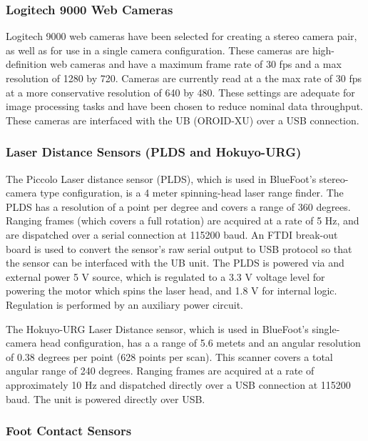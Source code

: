 			\subsubsection{Logitech 9000 Web Cameras}

				Logitech 9000 web cameras have been selected for creating a stereo camera pair, as well as for use in a single camera configuration. These cameras are high-definition web cameras and have a maximum frame rate of 30 fps and a max resolution of 1280 by 720. Cameras are currently read at a the max rate of 30 fps at a more conservative resolution of 640 by 480. These settings are adequate for image processing tasks and have been chosen to reduce nominal data throughput. These cameras are interfaced with the UB (OROID-XU) over a USB connection.

			\subsubsection{Laser Distance Sensors (PLDS and Hokuyo-URG)}

				The Piccolo Laser distance sensor (PLDS), which is used in BlueFoot's stereo-camera type configuration, is a 4 meter spinning-head laser range finder. The PLDS has a resolution of a point per degree and covers a range of 360 degrees. Ranging frames (which covers a full rotation) are acquired at a rate of 5 Hz, and are dispatched over a serial connection at 115200 baud. An FTDI break-out board is used to convert the sensor's raw serial output to USB protocol so that the sensor can be interfaced with the UB unit. The PLDS is powered via and external power 5 V source, which is regulated to a 3.3 V voltage level for powering the motor which spins the laser head, and 1.8 V for internal logic. Regulation is performed by an auxiliary power circuit.

				The Hokuyo-URG Laser Distance sensor, which is used in BlueFoot's single-camera head configuration, has a a range of 5.6 metets and an angular resolution of 0.38 degrees per point (628 points per scan). This scanner covers a total angular range of 240 degrees. Ranging frames are acquired at a rate of approximately 10 Hz and dispatched directly over a USB connection at 115200 baud. The unit is powered directly over USB.

			\subsubsection{Foot Contact Sensors}

